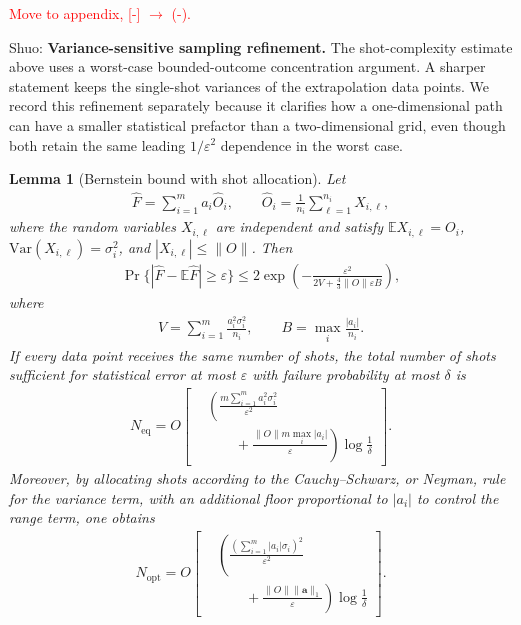 \documentclass[aps,pra,reprint,groupedaddress,floatfix]{revtex4-2}
\newtheorem{lemma}{Lemma}
\newcommand{\eps}{\varepsilon}
\newcommand{\mb}{\mathbb}
\newcommand{\sz}[1]{{\color{blue} Shuo: #1}}
\begin{document}
\textcolor{red}{Move to appendix, [-] $\rightarrow$ (-).}

\sz{\textbf{Variance-sensitive sampling refinement.}
The shot-complexity estimate above uses a worst-case bounded-outcome concentration argument. A sharper statement keeps the single-shot variances of the extrapolation data points. We record this refinement separately because it clarifies how a one-dimensional path can have a smaller statistical prefactor than a two-dimensional grid, even though both retain the same leading $1/\eps^2$ dependence in the worst case.}

\begin{lemma}[Bernstein bound with shot allocation]
\label{lem:bernstein-shot-allocation}
Let
\begin{equation*}
\begin{gathered}
    \widehat F=\sum_{i=1}^{m}a_i\widehat  O_i,
    \qquad
    \widehat O_i=\frac{1}{n_i}\sum_{\ell=1}^{n_i}X_{i,\ell},
\end{gathered}
\end{equation*}
\vspace{0.4em}
where the random variables $X_{i,\ell}$ are independent and satisfy
$\mb E X_{i,\ell}= O_i$, $\mathrm{Var}(X_{i,\ell})=\sigma_i^2$, and
$|X_{i,\ell}|\le \|O\|$.
Then
\begin{align}
\label{eq:bernstein-linear-estimator}
    \Pr\{|\widehat F-\mb E\widehat F|\ge \eps\}
    \le
    2\exp\left(
    -\frac{\eps^2}{2V+\frac{4}{3}\|O\|\eps B}
    \right),
\end{align}
where
\begin{align*}
    V=\sum_{i=1}^{m}\frac{a_i^2\sigma_i^2}{n_i},
    \qquad
    B=\max_i\frac{|a_i|}{n_i}.
\end{align*}
If every data point receives the same number of shots, the total number of shots sufficient for statistical error at most $\eps$ with failure probability at most $\delta$ is
\begin{align}
\label{eq:equal-shot-bound}
    N_{\mathrm{eq}}
    =
    O\left[
    \begin{aligned}
    &\left(
    \frac{m\sum_{i=1}^m a_i^2\sigma_i^2}{\eps^2}\right.\\
    &\left.\qquad+
    \frac{\|O\|m\max_i|a_i|}{\eps}
    \right)\log\frac{1}{\delta}
    \end{aligned}
    \right].
\end{align}
Moreover, by allocating shots according to the Cauchy--Schwarz, or Neyman, rule for the variance term, with an additional floor proportional to $|a_i|$ to control the range term, one obtains
\begin{align}
\label{eq:optimized-shot-bound}
    N_{\mathrm{opt}}
    =
    O\left[
    \begin{aligned}
    &\left(
    \frac{\left(\sum_{i=1}^{m}|a_i|\sigma_i\right)^2}{\eps^2}\right.\\
    &\left.\qquad+
    \frac{\|O\|\|\mathbf a\|_1}{\eps}
    \right)\log\frac{1}{\delta}
    \end{aligned}
    \right].
\end{align}
\end{lemma}
\end{document}
